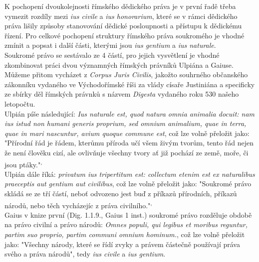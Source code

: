 \documentclass{article}
\begin{document}
K pochopení dvoukolejnosti římského dědického práva je v první řadě třeba vymezit rozdíly mezi \textit{ius civile} a \textit{ius honorarium}, které se v rámci dědického práva lišily způsoby stanovování dědické posloupnosti a přístupu k dědickému řízení. Pro celkové pochopení struktury římského práva soukromého je vhodné zmínit a popsat i další části, kterými jsou \textit{ius gentium} a \textit{ius naturale}. \\

Soukromé právo se sestávalo ze 4 částí, pro jejich vysvětlení je vhodné zkombinovat práci dvou významných římských právníků Ulpiána a Gaiuse. Můžeme přitom vycházet z \textit{Corpus Juris Civilis}, jakožto souhrného občanského zákonníku vydaného ve Východořímské říši za vlády císaře Justiniána a specificky ze sbírky děl římských právnků s názvem \textit{Digesta} vydaného roku 530 našeho letopočtu. \\


Ulpián píše následující: \textit{Ius naturale est, quod natura omnia animalia docuit: nam ius istud non humani generis proprium, sed omnium animalium, quae in terra, quae in mari nascuntur, avium quoque commune est}, což lze volně přeložit jako: "Přírodní řád je řádem, kterůmu příroda učí všem živým tvorům, tento řád nejen že není člověku cizí, ale ovlivňuje všechny tvory ať již pochází ze země, moře, či jsou ptáky."\textsuperscript{,} \\

Ulpián dále říká: \textit{privatum ius tripertitum est: collectum etenim est ex naturalibus praeceptis aut gentium aut civilibus}, což lze volně přeložit jako: "Soukromé právo skládá se ze tří částí, neboť odvozeno jest buď z příkazů přírodních, příkazů národů, nebo těch vycházejíc z práva civilního."\textsuperscript{,} \\

Gaius v knize první (Dig. 1.1.9., Gaius 1 inst.) soukromé právo rozděluje obdobě na právo civilní a právo národů: \textit{Omnes populi, qui legibus et moribus reguntur, partim suo proprio, partim communi omnium hominum.}, což lze volně přeložit jako: "Všechny národy, které se řídí zvyky a právem částečně používají práva svého a práva národů", tedy \textit{ius civile} a \textit{ius gentium}. \\
\end{document}
